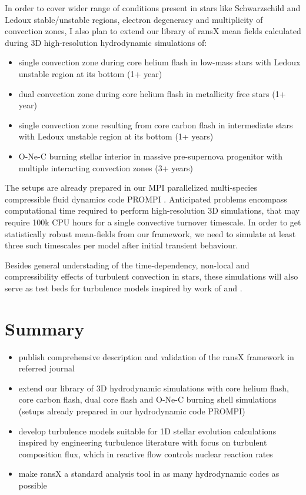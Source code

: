 \documentclass[11pt,paper=a4]{article}
\begin{document}
In order to cover wider range of conditions present in stars like Schwarzschild and Ledoux stable/unstable regions, electron degeneracy and multiplicity of convection zones, I also plan to extend our library of ransX mean fields calculated during 3D high-resolution hydrodynamic simulations of: 

\begin{itemize}
\item single convection zone during core helium flash in low-mass stars with Ledoux unstable region at its bottom \citep{Mocak2008,Mocak2009,Mocak2011} (1+ year)
\item dual convection zone during core helium flash in metallicity free stars \citep{Mocak2010} (1+ year)
\item single convection zone resulting from core carbon flash in intermediate stars with Ledoux unstable region at its bottom \citep{Mocak2011} (1+ years)
\item O-Ne-C burning stellar interior in massive pre-supernova progenitor with multiple interacting convection zones \citep{Meakin2006} (3+ years)
\end{itemize} 

The setups are already prepared in our MPI parallelized multi-species compressible fluid dynamics code PROMPI \citep{MeakinArnett2007}. Anticipated problems encompass computational time required to perform high-resolution 3D simulations, that may require 100k CPU hours for a single convective turnover timescale. In order to get statistically robust mean-fields from our framework, we need to simulate at least three such timescales per model after initial transient behaviour.

Besides general understading of the time-dependency, non-local and compressibility effects of turbulent convection in stars, these simulations will also serve as test beds for turbulence models inspired by work of \citet{rogers1989,lazeroms2013} and \citet{biferale2011}.

\section{Summary}

\begin{itemize}
\item publish comprehensive description and validation of the ransX framework in referred journal
\item extend our library of 3D hydrodynamic simulations with core helium flash, core carbon flash, dual core flash and O-Ne-C burning shell simulations (setups already prepared in our hydrodynamic code PROMPI)
\item develop turbulence models suitable for 1D stellar evolution calculations inspired by engineering turbulence literature with focus on turbulent composition flux, which in reactive flow controls nuclear reaction rates
\item make ransX a standard analysis tool in as many hydrodynamic codes as possible
\end{itemize}
  
\end{document}

